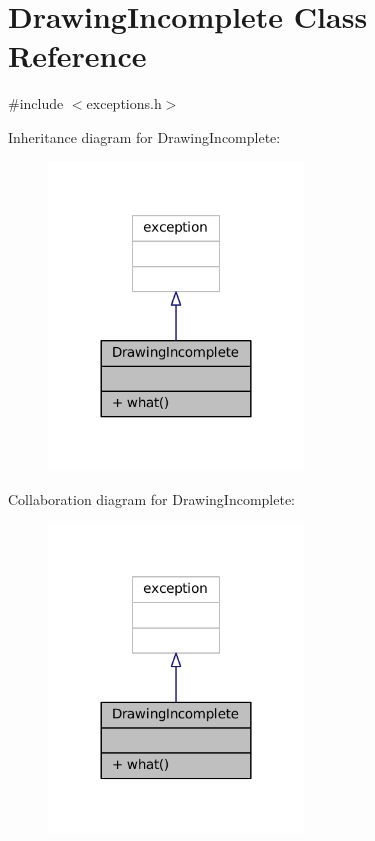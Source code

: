 \hypertarget{classDrawingIncomplete}{}\section{Drawing\+Incomplete Class Reference}
\label{classDrawingIncomplete}


{\ttfamily \#include $<$exceptions.\+h$>$}



Inheritance diagram for Drawing\+Incomplete\+:
\nopagebreak
\begin{figure}[H]
\begin{center}
\leavevmode
\includegraphics[width=192pt]{classDrawingIncomplete__inherit__graph}
\end{center}
\end{figure}


Collaboration diagram for Drawing\+Incomplete\+:
\nopagebreak
\begin{figure}[H]
\begin{center}
\leavevmode
\includegraphics[width=192pt]{classDrawingIncomplete__coll__graph}
\end{center}
\end{figure}

